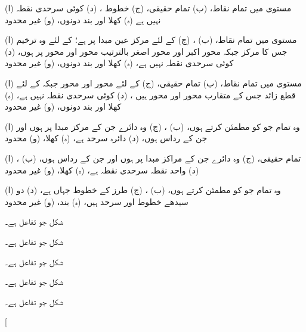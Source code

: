 \begin {description}\setlength {\parskip }{0pt} \setlength {\itemsep }{0pt plus 1pt}
\item [
1)
]
 (ا) مستوی  میں تمام نقاط، (ب) تمام حقیقی، (ج) خطوط ، (د) کوئی سرحدی نقطہ نہیں ہے (ہ) کھلا اور بند دونوں، (و) غیر محدود 
\item [
3)
]
 (ا) مستوی  میں تمام نقاط، (ب) ، (ج)  کے لئے مرکز عین مبدا پر ہے؛  کے لئے وہ ترخیم جس کا مرکز  جبکہ محور اکبر اور محور اصغر بالترتیب محور  اور محور  پر ہوں، (د) کوئی سرحدی نقطہ نہیں ہے، (ہ) کھلا اور بند دونوں، (و) غیر محدود 
\item [
5)
]
 (ا) مستوی  میں تمام نقاط، (ب) تمام حقیقی، (ج)  کے لئے محور  اور محور  جبکہ  کے لئے قطع زائد جس کے متقارب محور  اور محور  ہیں ، (د) کوئی سرحدی نقطہ نہیں ہے، (ہ) کھلا اور بند دونوں، (و) غیر محدود 
\item [
7)
]
 (ا) وہ تمام  جو  کو مطمئن کرتے ہوں، (ب) ، (ج) وہ دائرے جن کے مرکز مبدا پر ہوں اور جن کے رداس  ہوں، (د) دائرہ  سرحد ہے، (ہ) کھلا، (و) محدود 
\item [
9)
]
 (ا) ، (ب) تمام حقیقی، (ج) وہ دائرے جن کے مراکز مبدا پر ہوں اور جن کے رداس  ہوں، (د) واحد نقطہ  سرحدی نقطہ ہے، (ہ) کھلا، (و) غیر محدود 
\item [
11)
]
 (ا) وہ تمام  جو  کو مطمئن کرتے ہوں، (ب) ، (ج)  طرز کے خطوط جہاں  ہے، (د) دو سیدھے خطوط  اور  سرحد ہیں، (ہ) بند، (و) غیر محدود 
\item [
13)
]
 شکل  جو تفاعل  ہے۔ 
\item [
14)
]
 شکل  جو تفاعل  ہے۔ 
\item [
15)
]
 شکل  جو تفاعل  ہے۔ 
\item [
16)
]
 شکل  جو تفاعل  ہے۔ 
\item [
17)
]
 شکل  جو تفاعل  ہے۔ 
\item [

\end{description}
